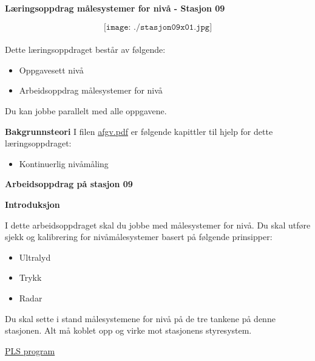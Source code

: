 

\vskip 5pt

\vskip 5pt
\begin{center}
	\huge
	\textbf{Læringsoppdrag målesystemer for nivå - Stasjon 09}
	\normalsize
\vskip 5pt 
\end{center}

$$\texttt{[image: ./stasjon09x01.jpg]}$$\\

\vskip 1cm
Dette læringsoppdraget består av følgende:

\begin{itemize}[noitemsep]
	\item Oppgavesett nivå
	\item Arbeidsoppdrag målesystemer for nivå
\end{itemize}


 
\vskip 5pt 

Du kan jobbe parallelt med alle oppgavene. 

\vskip 5pt 
\textbf{Bakgrunnsteori}
 I filen \href {https://autofaget.no/pdfs/afgv.pdf}{afgv.pdf} er følgende kapittler til hjelp for dette læringsoppdraget:
 \begin{itemize}[noitemsep]
	 \item Kontinuerlig nivåmåling 
 \end{itemize}
\newpage
\textbf{Arbeidsoppdrag på stasjon 09}

\vskip 1cm

\textbf{Introduksjon}

I dette arbeidsoppdraget skal du jobbe med målesystemer for nivå. Du skal utføre sjekk og kalibrering for nivåmålesystemer basert på følgende prinsipper:
\begin{itemize}[noitemsep]
	\item Ultralyd
	\item Trykk
	\item Radar
\end{itemize}
Du skal sette i stand målesystemene for nivå på de tre tankene på denne stasjonen. Alt må koblet opp og virke mot stasjonens styresystem. 


\vskip 5pt 
\href{https://rfka-my.sharepoint.com/:u:/g/personal/fred-olav_mosdal_skole_rogfk_no/ERzbfEJZaxBAl56UPNVVfHIBnXMchSzDcDhPciHAQsc2rQ?e=r6kvYj}{PLS program}

\vskip 5pt 

